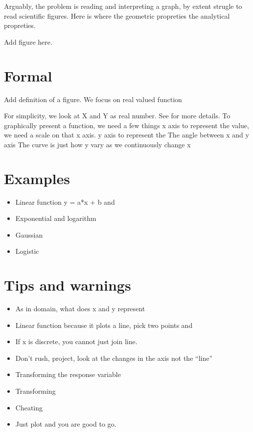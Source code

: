 \documentclass[
  letterpaper,
  DIV=11,
  numbers=noendperiod]{scrreprt}
\providecommand{\tightlist}{%
  \setlength{\itemsep}{0pt}\setlength{\parskip}{0pt}}
\begin{document}
Arguably, the problem is reading and interpreting a graph, by extent
strugle to read scientific figures. Here is where the geometric
propreties the analytical propreties.

Add figure here.

\section*{Formal}\label{formal-8}


Add definition of a figure. We focus on real valued function

For simplicity, we look at X and Y as real number. See for more details.
To graphically present a function, we need a few things x axis to
represent the value, we need a scale on that x axis. y axis to represent
the The angle between x and y axis The curve is just how y vary as we
continuously change x

\section*{Examples}\label{examples-8}


\begin{itemize}
\item
  Linear function y = a*x + b and
\item
  Exponential and logarithm
\item
  Gaussian
\item
  Logistic
\end{itemize}

\section*{Tips and warnings}\label{tips-and-warnings-1}


\begin{itemize}
\tightlist
\item
  As in domain, what does x and y represent
\item
  Linear function because it plots a line, pick two points and
\item
  If x is discrete, you cannot just join line.
\item
  Don't rush, project, look at the changes in the axis not the ``line''
\item
  Transforming the response variable
\item
  Transforming
\item
  Cheating
\item
  Just plot and you are good to go.
\end{itemize}
\end{document}

